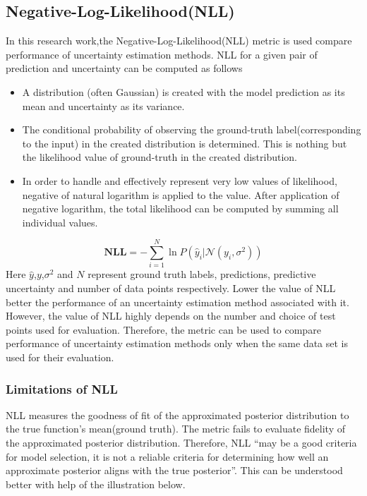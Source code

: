 \subsection{Negative-Log-Likelihood(NLL)}
In this research work,the Negative-Log-Likelihood(NLL) metric is used compare performance of uncertainty estimation methods. NLL for a given pair of prediction and uncertainty can be computed as follows
\begin{itemize}
	\item A distribution (often Gaussian) is created with the model prediction as its mean and uncertainty as its variance.
	\item The conditional probability of observing the ground-truth label(corresponding to the input) in the created distribution is determined. This is nothing but the likelihood value of ground-truth in the created distribution.
	\item  In order to handle and effectively represent very low values of likelihood, negative of natural logarithm is applied  to the value. After application of negative logarithm, the total likelihood can be computed by summing all individual values.
\end{itemize}
\begin{equation}
	\mathbf{NLL} = -\sum_{i=1}^{N}\ln P(\hat{y}_i|\mathcal{N}(y_i,\sigma^2)) 
\end{equation}
Here $\hat{y}$,$y$,$\sigma^2$ and $N$ represent ground truth labels, predictions, predictive uncertainty and number of data points respectively.
Lower the value of NLL better the performance of an uncertainty estimation method associated with it. However, the value of NLL highly depends on the number and choice of test points used for evaluation. Therefore, the metric can be used to compare performance of uncertainty estimation methods only when the same data set is used for their evaluation.
\subsubsection{Limitations of NLL}
NLL measures the goodness of fit of the approximated posterior distribution to the true function's mean(ground truth). The metric fails to evaluate fidelity of the approximated posterior distribution. Therefore, NLL \enquote{may be a good criteria for model
selection, it is not a reliable criteria for determining how well an approximate posterior aligns with the true posterior}\cite{yao2019quality}. This can be understood better with help of the illustration below.  

